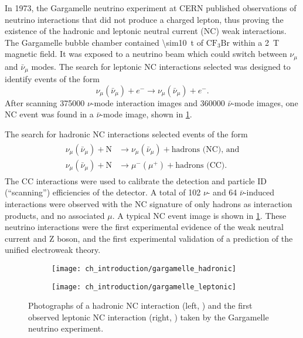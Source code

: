 In 1973, the Gargamelle neutrino experiment at CERN
published observations of neutrino interactions
that did not produce a charged lepton,
thus proving the existence of the hadronic \cite{gargamelle,gargamelle_short}
and leptonic \cite{gargamelle_leptonic} neutral current (NC) weak interactions.
The Gargamelle bubble chamber contained \SI{\sim10}{\tonne} of
$\text{CF}_3\text{Br}$ within a \SI{2}{\tesla} magnetic field.
It was exposed to a neutrino beam which could switch
between $\nu_\mu$ and $\bar{\nu}_\mu$ modes.
The search for leptonic NC interactions selected was designed
to identify events of the form
\begin{equation}\label{eq:leptonic_neutral_current}
    \nu_\mu(\bar{\nu}_\mu) + e^- \to \nu_\mu(\bar{\nu}_\mu) + e^-.
\end{equation}
After scanning \num{375000} $\nu$-mode interaction images
and \num{360000} $\bar{\nu}$-mode images,
one NC event was found in a $\bar{\nu}$-mode image,
shown in \cref{fig:gargamelle}.

The search for hadronic NC interactions selected events of the form
\begin{align}\label{eq:neutral_current}
    \begin{split}
        \nu_\mu(\bar{\nu}_\mu) + \text{N} &\to \nu_\mu(\bar{\nu}_\mu)
        + \text{hadrons (NC), and} \\
        \nu_\mu(\bar{\nu}_\mu) + \text{N} &\to \mu^-(\mu^+) + \text{hadrons (CC)}.
    \end{split}
\end{align}
The CC interactions were used to calibrate the detection and particle ID (``scanning'')
efficiencies of the detector.
A total of 102 $\nu$- and 64 $\bar{\nu}$-induced interactions were observed
with the NC signature of only hadrons as interaction products,
and no associated $\mu$.
A typical NC event image is shown in \cref{fig:gargamelle}.
These neutrino interactions were the first experimental evidence
of the weak neutral current and Z boson,
and the first experimental validation of a prediction of
the unified electroweak theory.


\begin{figure}
    \centering
    \begin{subfigure}{0.49\textwidth}
        \texttt{[image: ch\_introduction/gargamelle\_hadronic]}
    \end{subfigure}
    \begin{subfigure}{0.49\textwidth}
        \texttt{[image: ch\_introduction/gargamelle\_leptonic]}
    \end{subfigure}
    \caption[Neutral current bubble chamber photographs]{
        Photographs of a hadronic NC interaction (left, \cite{gargamelle})
        and the first observed leptonic NC interaction
        (right, \cite{gargamelle_leptonic_image})
        taken by the Gargamelle neutrino experiment.
    }
    \label{fig:gargamelle}
\end{figure}

